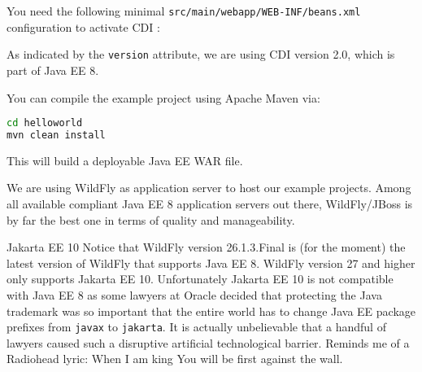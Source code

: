 You need the following minimal \texttt{src/main/webapp/WEB-INF/beans.xml} configuration to activate CDI \cite{CDI2}:

As indicated by the \texttt{version} attribute, we are using CDI version 2.0, which is part of Java EE 8.

You can compile the example project using Apache Maven via:
\begin{lstlisting}[language=bash]
cd helloworld
mvn clean install
\end{lstlisting}
This will build a deployable Java EE WAR file.

We are using WildFly \cite{WildFly} as application server to host our example projects.
Among all available compliant Java EE 8 application servers out there,
WildFly/JBoss is by far the best one in terms of quality and manageability.

\begin{ClownComputing}{Jakarta EE 10}
	Notice that WildFly version 26.1.3.Final is (for the moment) the latest version of WildFly that supports Java EE 8.
	WildFly version 27 and higher only supports Jakarta EE 10.
	Unfortunately Jakarta EE 10 is not compatible with Java EE 8 as some lawyers at Oracle decided that protecting the Java trademark was so important that the entire world has to change Java EE package prefixes from \texttt{javax} to \texttt{jakarta}.
	It is actually unbelievable that a handful of lawyers caused such a disruptive artificial technological barrier.
	Reminds me of a Radiohead lyric: When I am king
	You will be first against the wall.
\end{ClownComputing}

